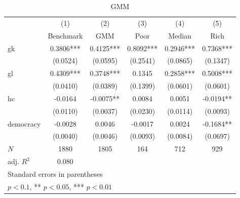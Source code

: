 \begin{table}[htbp]\centering
\def\sym#1{\ifmmode^{#1}\else\(^{#1}\)\fi}
\caption{GMM \label{tab:GMM}}
\begin{tabular}{l*{5}{c}}
\hline\hline
            &\multicolumn{1}{c}{(1)}&\multicolumn{1}{c}{(2)}&\multicolumn{1}{c}{(3)}&\multicolumn{1}{c}{(4)}&\multicolumn{1}{c}{(5)}\\
            &\multicolumn{1}{c}{Benchmark}&\multicolumn{1}{c}{GMM}&\multicolumn{1}{c}{Poor}&\multicolumn{1}{c}{Median}&\multicolumn{1}{c}{Rich}\\
\hline
gk          &      0.3806***&      0.4125***&      0.8092***&      0.2946***&      0.7368***\\
            &    (0.0524)   &    (0.0595)   &    (0.2541)   &    (0.0865)   &    (0.1347)   \\
[1em]
gl          &      0.4309***&      0.3748***&      0.1345   &      0.2858***&      0.5008***\\
            &    (0.0410)   &    (0.0389)   &    (0.1399)   &    (0.0601)   &    (0.0601)   \\
[1em]
hc          &     -0.0164   &     -0.0075** &      0.0084   &      0.0051   &     -0.0194** \\
            &    (0.0110)   &    (0.0037)   &    (0.0230)   &    (0.0114)   &    (0.0093)   \\
[1em]
democracy   &     -0.0028   &      0.0046   &     -0.0017   &      0.0024   &     -0.1684** \\
            &    (0.0040)   &    (0.0046)   &    (0.0093)   &    (0.0084)   &    (0.0697)   \\
\hline
\(N\)       &        1880   &        1805   &         164   &         712   &         929   \\
adj. \(R^{2}\)&       0.080   &               &               &               &               \\
\hline\hline
\multicolumn{6}{l}{\footnotesize Standard errors in parentheses}\\
\multicolumn{6}{l}{\footnotesize * \(p<0.1\), ** \(p<0.05\), *** \(p<0.01\)}\\
\end{tabular}
\end{table}
